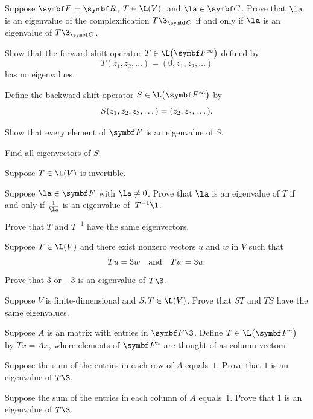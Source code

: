 \begin{exercises}
\exercise
Suppose $\F{} = \R{}$, $T \in \L(V)$, and $\la \in \C{}$. Prove that $\la$ is an eigenvalue of the complexification $T\3_{\C{}}$ if and only if $\bar{\la}$ is an eigenvalue of $T\3_{\C{}}$.\label{5TC}


\exercise
Show that the forward shift operator $T \in \L\paren[\big]{\F{\infty}}$ defined by
\[
T(z_1, z_2, \dots ) = (0, z_1, z_2, \dots )
\]
has no eigenvalues.


\exercise
Define the backward shift operator $S \in \L\paren[\big]{\F{\infty}}$ by
\[ \addtolength{\belowdisplayskip}{-3bp}
S(z_1, z_2, z_3, \dots) = (z_2, z_3, \dots).
\]
\begin{subtheorem}
\item
Show that every element of $\F{}$ is an eigenvalue of $S$.
\item
Find all eigenvectors of $S$.
\end{subtheorem}
\exercisesubtheoremend


\exercise
Suppose $T \in \L(V)$ is invertible.
\begin{subtheorem}
\item
Suppose $\la \in \F{}$ with $\la \ne 0$. Prove that $\la$ is an eigenvalue of $T$ if and only if $\frac{1}{\la}$ is an eigenvalue of~$T^{-1}\1$.
\item
Prove that $T$ and $T^{-1}$ have the same eigenvectors.
\end{subtheorem}
\exercisesubtheoremend


\exercise
Suppose $T \in \L(V)$ and there exist nonzero vectors $u$ and $w$ in $V$ such that
\[
Tu = 3w \quad \text{and} \quad Tw = 3u.
\]
Prove that $3$ or $-3$ is an eigenvalue of $T\3$.


\exercise
Suppose $V$ is finite-dimensional and $S, T \in \L(V)$.  Prove that $ST$ and $TS$ have the same eigenvalues.

\exercise
Suppose $A$ is an  matrix with entries in $\F{}\3$. Define $T \in \L\paren[\big]{\F{n}}$ by $Tx = Ax$, where elements of $\F{n}$ are thought of as  column vectors.
\begin{subtheorem}
\item
Suppose the sum of the entries in each row of $A$ equals~$1$.
Prove that $1$ is an eigenvalue of $T\3$.
\item
Suppose the sum of the entries in each column of $A$ equals~$1$.
Prove that $1$ is an eigenvalue of $T\3$.
\end{subtheorem}
\exercisesubtheoremend



\end{exercises}
